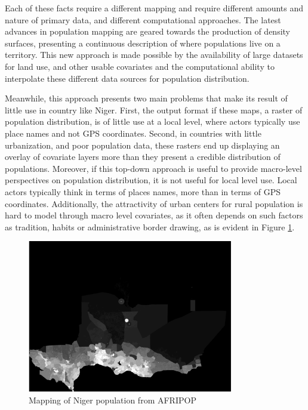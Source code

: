 Each of these facts require a different mapping and require different amounts and nature of primary data, and different computational approaches. The latest advances in population mapping are geared towards the production of density surfaces, presenting a continuous description of where populations live on a territory\cite{linard_population_2012}. This new approach is made possible by the availability of large datasets for land use, and other usable covariates and the computational ability to interpolate these  different data sources for population distribution\cite{stevens_disaggregating_2015}.

Meanwhile, this approach presents two main problems that make its result of little use in country like Niger. First, the output format if these maps, a raster of population distribution, is of little use at a local level, where actors typically use place names and not GPS coordinates. Second, in countries with little urbanization, and poor population data, these rasters end up displaying an overlay of covariate layers more than they present a credible distribution of populations. Moreover, if this top-down approach is useful to provide macro-level perspectives on population distribution, it is not useful for local level use. Local actors typically think in terms of places names, more than in terms of GPS coordinates. Additionally, the attractivity of urban centers for rural population is hard to model through macro level covariates, as it often depends on such factors as tradition, habits or administrative border drawing, as is evident in Figure \ref{AfriPopMap}.

\begin{figure}
	\begin{center}
	\includegraphics[width=0.8\textwidth]{figure/WORLDPOP_Niger.png}
	\caption{Mapping of Niger population from AFRIPOP}
	\label{AfriPopMap}
	\end{center}
\end{figure}

